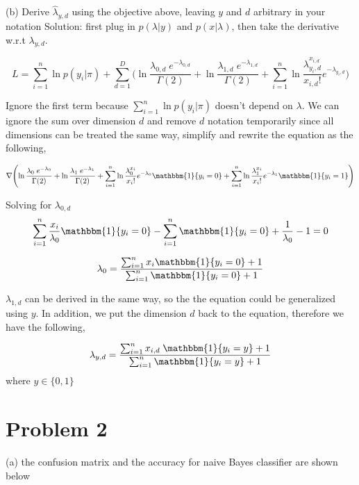 \documentclass[11pt]{report}
\begin{document}
\pagebreak

\justify (b) Derive $\hat{\lambda}_{y, d}$ using the objective above, leaving $y$ and $d$ arbitrary in your notation
\justify Solution: first plug in $p(\lambda | y)$ and $p(x | \lambda)$, then take the derivative w.r.t $\lambda_{y,d}$. 

\[
L= \sum_{i=1}^{n} \ln {p(y_{i}|\pi)} +  \sum_{d=1}^{D} \Biggl( \ln{ \frac{ \lambda_{0,d} \; e^{-\lambda_{0,d}} } {\Gamma(2)} } + \ln{ \frac{ \lambda_{1,d} \; e^{-\lambda_{1,d}} } {\Gamma(2)} }  + \sum_{i=1}^{n} \ln{\frac{ \lambda_{y_{i}, d}^{x_{i,d}}} {x_{i,d}!}e^ {-\lambda_{y_{i},d}} \Biggr)}
\]

\-
\justify Ignore the first term because $\sum_{i=1}^{n} \ln {p(y_{i}|\pi)}$ doesn't depend on $\lambda$. We can ignore the sum over dimension $d$ and remove $d$ notation temporarily since all dimensions can be treated the same way, simplify and rewrite the equation as the following, 

\begin{small}
\[
\nabla{
\Biggl(
\ln{ \frac{ \lambda_{0} \; e^{-\lambda_{0}} } {\Gamma(2)} } + \ln{ \frac{ \lambda_{1} \; e^{-\lambda_{1}} } {\Gamma(2)} }  
+ \sum_{i=1}^{n} \ln{\frac{ \lambda_{0}^{x_{i}}} {x_{i}!}e^ {-\lambda_{0}}  \mathbbm{1}\{ y_{i} = 0 \} } 
+ \sum_{i=1}^{n} \ln{\frac{ \lambda_{1}^{x_{i}}} {x_{i}!}e^ {-\lambda_{1}}  \mathbbm{1}\{ y_{i} = 1} \}
\Biggr)
}
\]
\end{small}

\-
\justify Solving for $\lambda_{0, d}$
\[
\sum_{i=1}^{n} \frac{ x_{i} } {\lambda_{0}} \mathbbm{1}\{ y_{i} = 0 \}   -  \sum_{i=1}^{n} \mathbbm{1}\{ y_{i} = 0 \}  + \frac {1} {\lambda_{0}} - 1 = 0 
\]

\[
\lambda_{0} = \frac {\sum_{i=1}^{n} x_{i} \mathbbm{1}\{ y_{i} = 0 \} + 1} {\sum_{i=1}^{n} \mathbbm{1}\{ y_{i} = 0 \} + 1} 
\]

\- 
\justify $\lambda_{1,d}$ can be derived in the same way, so the the equation could be generalized using $y$. In addition, we put the dimension $d$ back to the equation, therefore we have the following,

\[
\lambda_{y, d} = \frac {\sum_{i=1}^{n} x_{i, d} \; \mathbbm{1}\{ y_{i} = y \} + 1} {\sum_{i=1}^{n} \mathbbm{1}\{ y_{i} = y \} + 1}  
\]
where $y \in \{0, 1\}$

\pagebreak

\section* {Problem 2}
\justify (a) the confusion matrix and the accuracy for naive Bayes classifier are shown below
\end{document}
